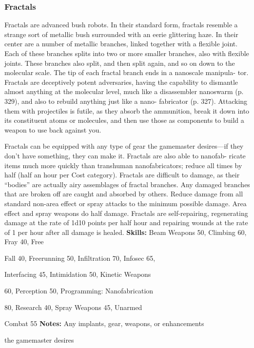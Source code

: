 \subsubsection{Fractals }

Fractals are advanced bush robots. In their standard 
form, fractals resemble a strange sort of metallic 
bush surrounded with an eerie glittering haze. In 
their center are a number of metallic branches, linked 
together with a flexible joint. Each of these branches 
splits into two or more smaller branches, also with 
flexible joints. These branches also split, and then split 
again, and so on down to the molecular scale. The tip 
of each fractal branch ends in a nanoscale manipula-
tor. Fractals are deceptively potent adversaries, having 
the capability to dismantle almost anything at the 
molecular level, much like a disassembler nanoswarm 
(p. 329), and also to rebuild anything just like a nano-
fabricator (p. 327). Attacking them with projectiles is 
futile, as they absorb the ammunition, break it down 
into its constituent atoms or molecules, and then use 
those as components to build a weapon to use back 
against you.

Fractals can be equipped with any type of gear the 
gamemaster desires—if they don't have something, 
they can make it. Fractals are also able to nanofab-
ricate items much more quickly than transhuman 
nanofabricators; reduce all times by half (half an hour 
per Cost category). Fractals are difficult to damage, as 
their ``bodies'' are actually airy assemblages of fractal 
branches. Any damaged branches that are broken off 
are caught and absorbed by others. Reduce damage 
from all standard non-area effect or spray attacks to 
the minimum possible damage. Area effect and spray 
weapons do half damage. Fractals are self-repairing, 
regenerating damage at the rate of 1d10 points per 
half hour and repairing wounds at the rate of 1 per 
hour after all damage is healed.
\textbf{Skills:} Beam Weapons 50, Climbing 60, Fray 40, Free 

Fall 40, Freerunning 50, Infiltration 70, Infosec 65, 

Interfacing 45, Intimidation 50, Kinetic Weapons 

60, Perception 50, Programming: Nanofabrication 

80, Research 40, Spray Weapons 45, Unarmed 

Combat 55
\textbf{Notes:} Any implants, gear, weapons, or enhancements 

the gamemaster desires

